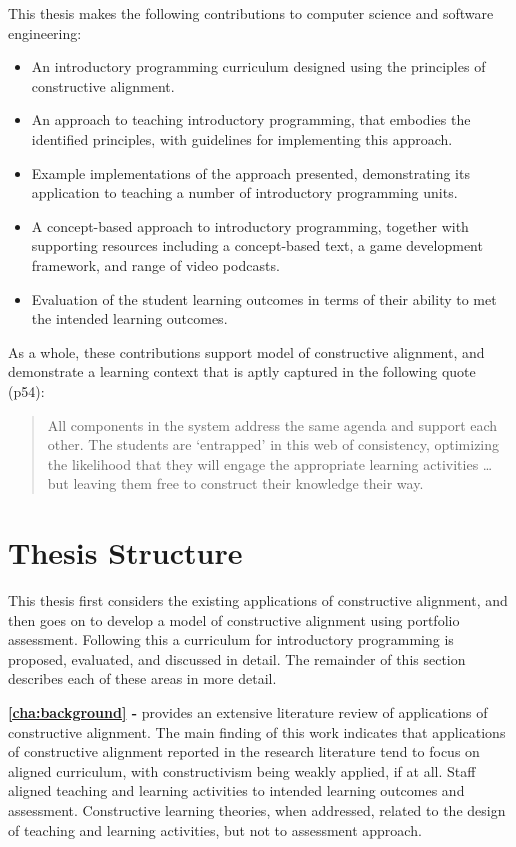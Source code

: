This thesis makes the following contributions to computer science and software engineering:
\begin{itemize}[noitemsep,nolistsep]
	\item An introductory programming curriculum designed using the principles of constructive alignment.
	\item An approach to teaching introductory programming, that embodies the identified principles, with guidelines for implementing this approach.
	\item Example implementations of the approach presented, demonstrating its application to teaching a number of introductory programming units.
	\item A concept-based approach to introductory programming, together with supporting resources including a concept-based text, a game development framework, and range of video podcasts.
	\item Evaluation of the student learning outcomes in terms of their ability to met the intended learning outcomes.
\end{itemize}

As a whole, these contributions support \citet{Biggs:1996c} model of constructive alignment, and demonstrate a learning context that is aptly captured in the following quote \citep{Biggs:2007} (p54):
\begin{quote}
	All components in the system address the same agenda and support each other. The students are `entrapped' in this web of consistency, optimizing the likelihood that they will engage the appropriate learning activities \ldots but leaving them free to construct their knowledge their way.
\end{quote}



\section{Thesis Structure} %
\label{sec:thesis_structure}

This thesis first considers the existing applications of constructive alignment, and then goes on to develop a model of constructive alignment using portfolio assessment. Following this a curriculum for introductory programming is proposed, evaluated, and discussed in detail. The remainder of this section describes each of these areas in more detail. 

\textbf{\cref{cha:background} - } provides an extensive literature review of applications of constructive alignment. The main finding of this work indicates that applications of constructive alignment reported in the research literature tend to focus on aligned curriculum, with constructivism being weakly applied, if at all. Staff aligned teaching and learning activities to intended learning outcomes and assessment. Constructive learning theories, when addressed, related to the design of teaching and learning activities, but not to assessment approach.

